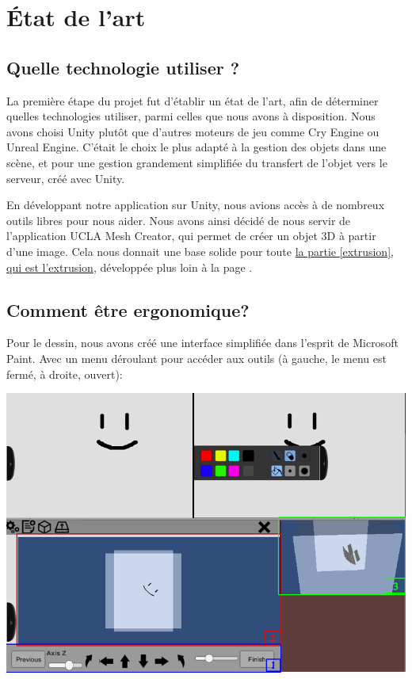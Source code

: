 \documentclass[a4paper,11pt]{article}
\begin{document}
	\section{État de l'art}
		\subsection{Quelle technologie utiliser ?}
		La première étape du projet fut d'établir un état de l'art, afin de déterminer quelles technologies utiliser, parmi celles que nous avons à disposition. Nous avons choisi Unity plutôt que d'autres moteurs de jeu comme Cry Engine ou Unreal Engine. C'était le choix le plus adapté à la gestion des objets dans une scène, et pour une gestion grandement simplifiée du transfert de l'objet vers le serveur, créé avec Unity. 
		
		En développant notre application sur Unity, nous avions accès à de nombreux outils libres pour nous aider. Nous avons ainsi décidé de nous servir de l'application UCLA Mesh Creator, qui permet de créer un objet 3D à partir d'une image. Cela nous donnait une base solide pour toute \hyperlink{ancre}{la partie \ref{extrusion}, qui est l'extrusion}, développée plus loin à la page \pageref{extrusion}. 
		
		\subsection{Comment être ergonomique?}
		Pour le dessin, nous avons créé une interface simplifiée dans l'esprit de Microsoft Paint. Avec un menu déroulant pour accéder aux outils (à gauche, le menu est fermé, à droite, ouvert):
		
		\centerline{\includegraphics[scale=0.5]{images/Cmt_placer.png}}
		
\end{document}
